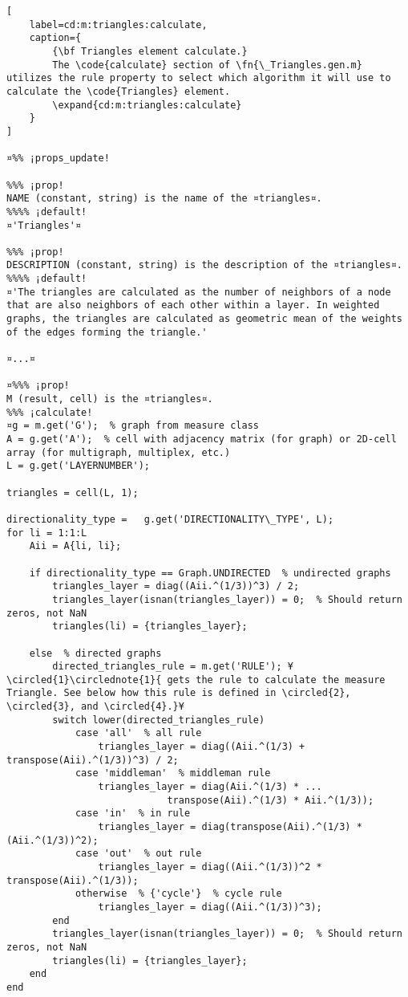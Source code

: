 \documentclass{tufte-handout}
\begin{document}
\begin{lstlisting}[
	label=cd:m:triangles:calculate,
	caption={
		{\bf Triangles element calculate.}
		The \code{calculate} section of \fn{\_Triangles.gen.m} utilizes the rule property to select which algorithm it will use to calculate the \code{Triangles} element.
		\expand{cd:m:triangles:calculate}
	}
]

¤%% ¡props_update!

%%% ¡prop!
NAME (constant, string) is the name of the ¤triangles¤.
%%%% ¡default!
¤'Triangles'¤

%%% ¡prop!
DESCRIPTION (constant, string) is the description of the ¤triangles¤.
%%%% ¡default!
¤'The triangles are calculated as the number of neighbors of a node that are also neighbors of each other within a layer. In weighted graphs, the triangles are calculated as geometric mean of the weights of the edges forming the triangle.'

¤...¤

¤%%% ¡prop!
M (result, cell) is the ¤triangles¤.
%%% ¡calculate!
¤g = m.get('G');  % graph from measure class
A = g.get('A');  % cell with adjacency matrix (for graph) or 2D-cell array (for multigraph, multiplex, etc.) 
L = g.get('LAYERNUMBER');

triangles = cell(L, 1);

directionality_type =   g.get('DIRECTIONALITY\_TYPE', L);
for li = 1:1:L        
	Aii = A{li, li};    
	
	if directionality_type == Graph.UNDIRECTED  % undirected graphs
		triangles_layer = diag((Aii.^(1/3))^3) / 2;
		triangles_layer(isnan(triangles_layer)) = 0;  % Should return zeros, not NaN
		triangles(li) = {triangles_layer};
	
	else  % directed graphs
		directed_triangles_rule = m.get('RULE'); ¥\circled{1}\circlednote{1}{ gets the rule to calculate the measure Triangle. See below how this rule is defined in \circled{2}, \circled{3}, and \circled{4}.}¥
		switch lower(directed_triangles_rule)
			case 'all'  % all rule
				triangles_layer = diag((Aii.^(1/3) + transpose(Aii).^(1/3))^3) / 2;
			case 'middleman'  % middleman rule
				triangles_layer = diag(Aii.^(1/3) * ...
							transpose(Aii).^(1/3) * Aii.^(1/3));
			case 'in'  % in rule
				triangles_layer = diag(transpose(Aii).^(1/3) * (Aii.^(1/3))^2);
			case 'out'  % out rule
				triangles_layer = diag((Aii.^(1/3))^2 * transpose(Aii).^(1/3));
			otherwise  % {'cycle'}  % cycle rule
				triangles_layer = diag((Aii.^(1/3))^3);
		end
		triangles_layer(isnan(triangles_layer)) = 0;  % Should return zeros, not NaN
		triangles(li) = {triangles_layer};
	end
end


\end{lstlisting}
\end{document}
